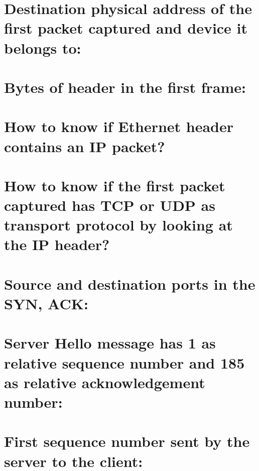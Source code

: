 \documentclass[]{report}
\begin{document}
\section{Destination physical address of the first packet captured and device it belongs to:}


\section{Bytes of header in the first frame:}


\section{How to know if Ethernet header contains an IP packet?}


\section{How to know if the first packet captured has TCP or UDP as transport protocol by looking at the IP header?}


\section{Source and destination ports in the SYN, ACK:}


\section{Server Hello message has 1 as relative sequence number and 185 as relative acknowledgement number:}


\section{First sequence number sent by the server to the client:}


\end{document}
